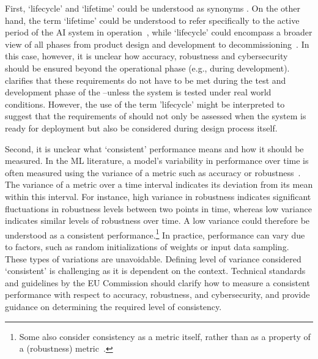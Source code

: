 First, `lifecycle' and `lifetime' could be understood as synonyms \cite{marcus2020promoting}. On the other hand, the term `lifetime' could be understood to refer specifically to the active period of the AI system in operation~\cite{murakami2010lifespan}, while `lifecycle' could encompass a broader view of all phases from product design and development to decommissioning~\cite{hamon2024three}. In this case, however, it is unclear how accuracy, robustness and cybersecurity should be ensured beyond the operational phase (e.g., during development). 
%  
 clarifies that these requirements do not have to be met during the test and development phase of the \HRAIS--unless the system is tested under real world conditions.
However, the use of the term 'lifecycle' might be interpreted to suggest that the requirements of  should not only be assessed when the system is ready for deployment but also be considered during design process itself.


Second, it is unclear what `consistent' performance means and how it should be measured.
In the ML literature, a model’s variability in performance over time is often measured using the variance of a metric such as accuracy or robustness~\cite{kilbertus2020fair, bechavod2019equal, rateike2022don}.
%
The variance of a metric over a time interval indicates its deviation from its mean within this interval. 
%
For instance, high variance in robustness indicates significant fluctuations in robustness levels between two points in time, whereas low variance indicates similar levels of robustness over time. 
%
A low variance could therefore be understood as a consistent performance.\footnote{Some also consider consistency as a metric itself, rather than as a property of a (robustness) metric~\cite{wei2020optimal}.} 
In practice, performance can vary due to factors, such as random initializations of weights or input data sampling.
%
These types of variations are unavoidable.
%
Defining level of variance considered `consistent' is challenging as it is dependent on the context.
%
Technical standards and guidelines by the EU Commission should clarify how to measure a consistent performance with respect to accuracy, robustness, and cybersecurity, and provide guidance on determining the required level of consistency.

